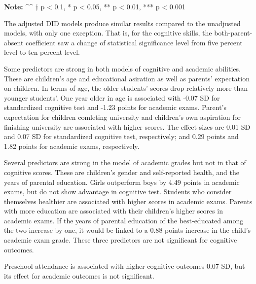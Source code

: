 \documentclass[
  man,floatsintext]{apa7}
\begin{document}
\textbf{Note:}
\^{}\^{} † p \textless{} 0.1, * p \textless{} 0.05, ** p \textless{} 0.01, *** p \textless{} 0.001

The adjusted DID models produce similar results compared to the unadjusted models, with only one exception. That is, for the cognitive skills, the both-parent-absent coefficient saw a change of statistical significance level from five percent level to ten percent level.

Some predictors are strong in both models of cognitive and academic abilities. These are children's age and educational asiration as well as parents' expectation on children. In terms of age, the older students' scores drop relatively more than younger students'. One year older in age is associated with -0.07 SD for standardized cognitive test and -1.23 points for academic exams. Parent's expectation for children comleting university and children's own aspiration for finishing university are associated with higher scores. The effect sizes are 0.01 SD and 0.07 SD for standardized cognitive test, respectively; and 0.29 points and 1.82 points for academic exams, respectively.

Several predictors are strong in the model of academic grades but not in that of cognitive scores. These are children's gender and self-reported health, and the years of parental education. Girls outperform boys by 4.49 points in academic exams, but do not show advantage in cognitive test. Students who consider themselves healthier are associated with higher scores in academic exams. Parents with more education are associated with their children's higher scores in academic exams. If the years of parental education of the best-educated among the two increase by one, it would be linked to a 0.88 points increase in the child's academic exam grade. These three predictors are not significant for cognitive outcomes.

Preschool attendance is associated with higher cognitive outcomes 0.07 SD, but its effect for academic outcomes is not significant.
\end{document}
